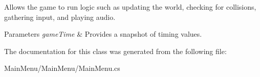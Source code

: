 Allows the game to run logic such as updating the world, checking for collisions, gathering input, and playing audio. 


\begin{DoxyParams}{Parameters}
{\em game\-Time} & Provides a snapshot of timing values.\\
\hline
\end{DoxyParams}


The documentation for this class was generated from the following file\-:\begin{DoxyCompactItemize}
\item 
Main\-Menu/\-Main\-Menu/Main\-Menu.\-cs\end{DoxyCompactItemize}
